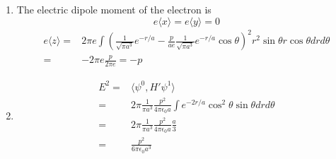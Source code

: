 \begin{enumerate}
\begin{enumerate}
    \begin{align*}
    (-\frac{\hbar^2}{2m}\nabla^2-\frac{\hbar^2}{ma}\frac{1}{r}+\frac{\hbar^2}{2ma^2})\psi^1 
    = \frac{ep\cos\theta}{4\pi\epsilon_0 r^2}\frac{1}{\sqrt{\pi a^3}}e^{-r/a}
\end{align*}
\begin{align*}
    r:
    -\frac{\hbar^2}{2m}(\frac{B}{a^2}-\frac{6C}{a})
    -\frac{\hbar^2}{ma}C +\frac{\hbar^2}{2ma^2} B= 0\Rightarrow C=0
\end{align*}
\begin{align*}
    1:
    -\frac{\hbar^2}{2m}(-\frac{4B}{a}+\frac{A}{a^2})-
    \frac{\hbar^2}{ma}B+\frac{\hbar^2}{2ma^2} A = 0\Rightarrow
    B=0
\end{align*}
\begin{align*}
    \frac{1}{r^2}:
    -\frac{\hbar^2}{2m} 2A= \frac{ep}{4\pi\epsilon_0}\frac{1}{\sqrt{\pi a^3}}
    \Rightarrow A = 
    -\frac{p}{ae}\frac{1}{\sqrt{\pi a^3}}
\end{align*}
\item 
The electric dipole moment of the electron is 
$$
e\langle x\rangle=e\langle y\rangle=0
$$
\begin{align*}
    e\langle z\rangle=&
    2\pi e\int 
    (\frac{1}{\sqrt{\pi a^3}}e^{-r/a}-\frac{p}{ae}\frac{1}{\sqrt{\pi a^3}}e^{-r/a}\cos\theta)^2r^2
    \sin\theta r\cos\theta  drd\theta \\
    =&
    -2\pi e\frac{p}{2\pi e} = -p
\end{align*}
\item 
\begin{align*}
    E^2 =& \langle\psi^0, H'\psi^1\rangle\\
    =&2\pi\frac{1}{\pi a^3}\frac{p^2}{4\pi\epsilon_0 a}
    \int e^{-2r/a}\cos^2\theta \sin\theta dr d\theta \\
    =&2\pi\frac{1}{\pi a^3}\frac{p^2}{4\pi\epsilon_0 a}\frac{a}{3}\\
    =&\frac{p^2}{6\pi\epsilon_0 a^3}
\end{align*}
\end{enumerate}

    
\end{enumerate}


